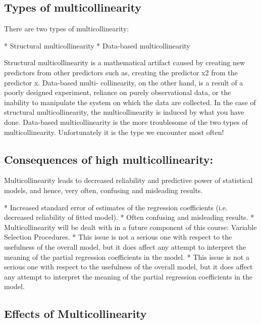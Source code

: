 \subsection{Types of multicollinearity}
There are two types of multicollinearity:
\begin{enumerate}
*  Structural multicollinearity
*  Data-based multicollinearity
\end{enumerate}
Structural multicollinearity is a mathematical artifact caused by creating new predictors from
other predictors such as, creating the predictor x2 from the predictor x. Data-based multi-
collinearity, on the other hand, is a result of a poorly designed experiment, reliance on purely
observational data, or the inability to manipulate the system on which the data are collected.
In the case of structural multicollinearity, the multicollinearity is induced by what you have
done. Data-based multicollinearity is the more troublesome of the two types of multicollinearity.
Unfortunately it is the type we encounter most often!

\subsection{Consequences of high multicollinearity:}
Multicollinearity leads to decreased reliability and predictive power of statistical models, and hence, very
often, confusing and misleading results.

\begin{itemize}
*  Increased standard error of estimates of the regression coefficients (i.e. decreased reliability of fitted
model).
*  Often confusing and misleading results.
*  Multicollinearity will be dealt with in a future component of this course: Variable Selection Procedures.
*  This issue is not a serious one with respect to the
usefulness of the overall model, but it does affect any attempt to interpret the meaning of the partial regression
coefficients in the model.
*   This issue is not a serious one with respect to the usefulness of the overall model, but it does affect any attempt to interpret the meaning of the partial regression coefficients in the model.

\end{itemize}

\subsection{Effects of Multicollinearity}

